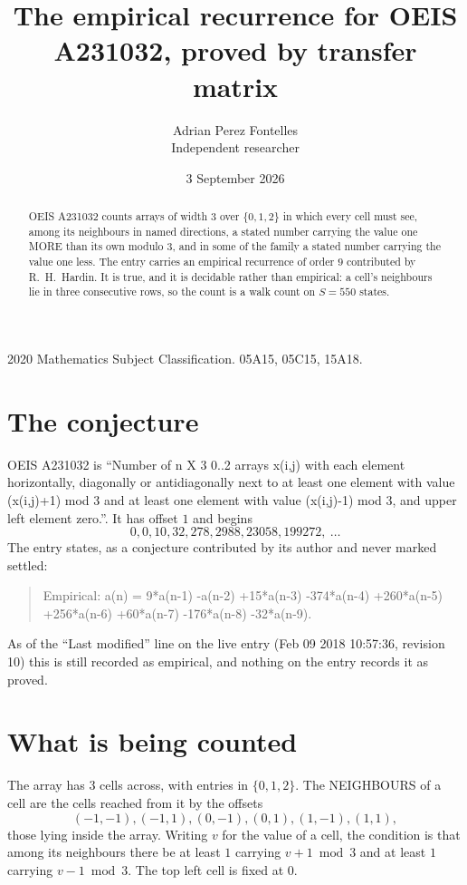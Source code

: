 \documentclass[11pt,a4paper]{article}
\title{The empirical recurrence for OEIS A231032, proved by transfer matrix}
\author{Adrian Perez Fontelles\\ \small Independent researcher}
\date{3 September 2026}
\theoremstyle{plain}
\theoremstyle{definition}
\begin{document}
\maketitle

\begin{abstract}
OEIS A231032 counts arrays of width $3$ over $\{0,1,2\}$ in which every cell must see, among its
neighbours in named directions, a stated number carrying the value one MORE than its own
modulo $3$, and in some of the family a stated number carrying the value one less. The entry
carries an empirical recurrence of order $9$ contributed by R.~H.~Hardin. It is true, and
it is decidable rather than empirical: a cell's neighbours lie in three consecutive rows, so
the count is a walk count on $S=550$ states.
\end{abstract}

\noindent\small 2020 Mathematics Subject Classification. 05A15, 05C15, 15A18.\normalsize

\section{The conjecture}

OEIS A231032 is ``Number of n X 3 0..2 arrays x(i,j) with each element horizontally, diagonally or antidiagonally next to at least one element with value (x(i,j)+1) mod 3 and at least one element with value (x(i,j)-1) mod 3, and upper left element zero.''. It has offset $1$ and begins
\[
0, 0, 10, 32, 278, 2988, 23058, 199272,\ \dots
\]
The entry states, as a conjecture contributed by its author and never marked settled:
\begin{quote}
Empirical: a(n) = 9*a(n-1) -a(n-2) +15*a(n-3) -374*a(n-4) +260*a(n-5) +256*a(n-6) +60*a(n-7) -176*a(n-8) -32*a(n-9).
\end{quote}
As of the ``Last modified'' line on the live entry (Feb 09 2018 10:57:36, revision 10) this is still
recorded as empirical, and nothing on the entry records it as proved.

\section{What is being counted}

The array has $3$ cells across, with entries in $\{0,1,2\}$. The NEIGHBOURS of a cell are the
cells reached from it by the offsets
\[
(-1,-1), (-1,1), (0,-1), (0,1), (1,-1), (1,1),
\]
those lying inside the array. Writing $v$ for the value of a cell, the condition is that among
its neighbours there be at least $1$ carrying $v+1 \bmod 3$ and at least $1$ carrying $v-1 \bmod 3$. The top left
cell is fixed at $0$.
\end{document}
